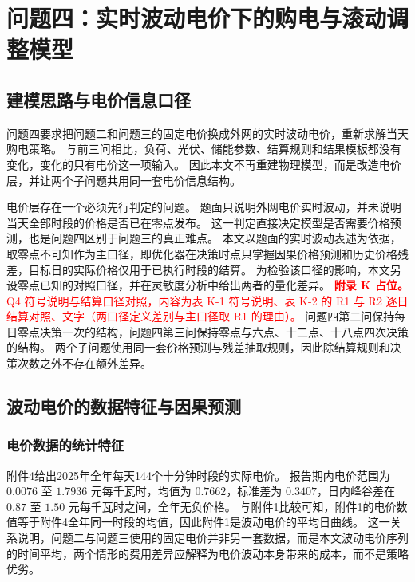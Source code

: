 \section{问题四：实时波动电价下的购电与滚动调整模型}

\subsection{建模思路与电价信息口径}

问题四要求把问题二和问题三的固定电价换成外网的实时波动电价，重新求解当天购电策略。
与前三问相比，负荷、光伏、储能参数、结算规则和结果模板都没有变化，变化的只有电价这一项输入。
因此本文不再重建物理模型，而是改造电价层，并让两个子问题共用同一套电价信息结构。

电价层存在一个必须先行判定的问题。
题面只说明外网电价实时波动，并未说明当天全部时段的价格是否已在零点发布。
这一判定直接决定模型是否需要价格预测，也是问题四区别于问题三的真正难点。
本文以题面的实时波动表述为依据，取零点不可知作为主口径，即优化器在决策时点只掌握因果价格预测和历史价格残差，目标日的实际价格仅用于已执行时段的结算。
为检验该口径的影响，本文另设零点已知的对照口径，并在灵敏度分析中给出两者的量化差异。
\textcolor{red}{\textbf{附录 K 占位。}Q4 符号说明与结算口径对照，内容为表 K-1 符号说明、表 K-2 的 R1 与 R2 逐日结算对照、文字（两口径定义差别与主口径取 R1 的理由）。}
问题四第二问保持每日零点决策一次的结构，问题四第三问保持零点与六点、十二点、十八点四次决策的结构。
两个子问题使用同一套价格预测与残差抽取规则，因此除结算规则和决策次数之外不存在额外差异。

\subsection{波动电价的数据特征与因果预测}

\subsubsection{电价数据的统计特征}

附件4给出2025年全年每天144个十分钟时段的实际电价。
报告期内电价范围为 \(0.0076\) 至 \(1.7936\) 元每千瓦时，均值为 \(0.7662\)，标准差为 \(0.3407\)，日内峰谷差在 \(0.87\) 至 \(1.50\) 元每千瓦时之间，全年无负价格。
与附件1比较可知，附件1的电价数值等于附件4全年同一时段的均值，因此附件1是波动电价的平均日曲线。
这一关系说明，问题二与问题三使用的固定电价并非另一套数据，而是本文波动电价序列的时间平均，两个情形的费用差异应解释为电价波动本身带来的成本，而不是策略优劣。

